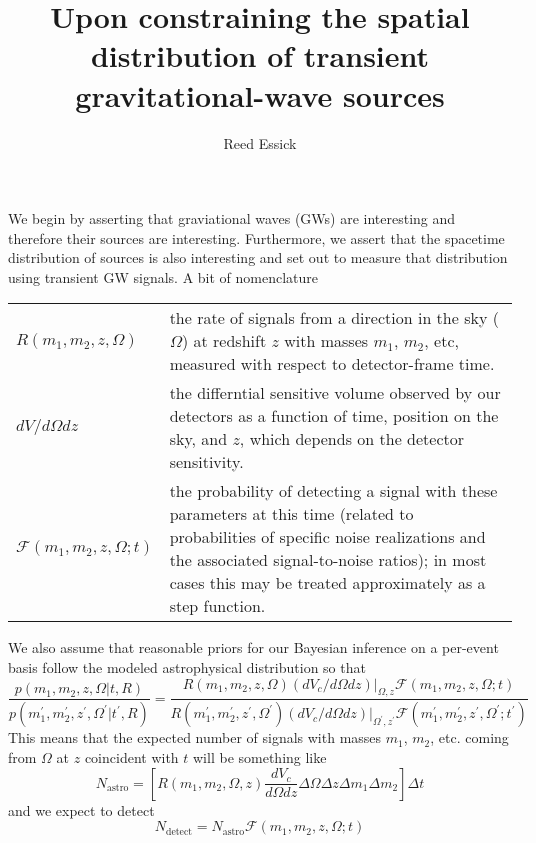 \documentclass{article}
\begin{document}
\title{
Upon constraining the spatial distribution of transient gravitational-wave sources
}

\author{
Reed Essick
}

\maketitle


\doublespace

We begin by asserting that graviational waves (GWs) are interesting and therefore their sources are interesting.
Furthermore, we assert that the spacetime distribution of sources is also interesting and set out to measure that distribution using transient GW signals.
A bit of nomenclature

\vspace{0.5cm}
\begin{tabular}{p{3cm}p{12cm}}
    $R(m_1, m_2, z, \Omega)$ & the rate of signals from a direction in the sky ($\Omega$) at redshift $z$ with masses $m_1$, $m_2$, etc, measured with respect to detector-frame time. \\
    $dV/d\Omega dz$     & the differntial sensitive volume observed by our detectors as a function of time, position on the sky, and $z$, which depends on the detector sensitivity. \\
    $\mathcal{F}(m_1,m_2,z,\Omega;t)$ & the probability of detecting a signal with these parameters at this time (related to probabilities of specific noise realizations and the associated signal-to-noise ratios); in most cases this may be treated approximately as a step function.
\end{tabular}

\vspace{0.5cm}
\noindent
We also assume that reasonable priors for our Bayesian inference on a per-event basis follow the modeled astrophysical distribution so that
\begin{equation}
    \frac{p(m_1, m_2, z, \Omega|t,R)}{p(m_1^\prime, m_2^\prime, z^\prime, \Omega^\prime|t^\prime,R)} = \frac{R(m_1, m_2, z, \Omega) \left.(dV_c/d\Omega dz)\right|_{\Omega, z} \mathcal{F}(m_1, m_2, z, \Omega; t)}{R(m_1^\prime, m_2^\prime, z^\prime, \Omega^\prime) \left.(dV_c/d\Omega dz)\right|_{\Omega^\prime, z^\prime} \mathcal{F}(m_1^\prime, m_2^\prime, z^\prime, \Omega^\prime; t^\prime)}
\end{equation}
This means that the expected number of signals with masses $m_1$, $m_2$, etc. coming from $\Omega$ at $z$ coincident with $t$ will be something like 
\begin{equation}
    N_\mathrm{astro} = \left[ R(m_1, m_2, \Omega, z) \frac{dV_c}{d\Omega dz} \Delta\Omega \Delta z \Delta m_1 \Delta m_2 \right] \Delta t
\end{equation}
and we expect to detect 
\begin{equation}
    N_\mathrm{detect} = N_\mathrm{astro} \mathcal{F}(m_1, m_2, z, \Omega; t)
\end{equation}
\end{document}
